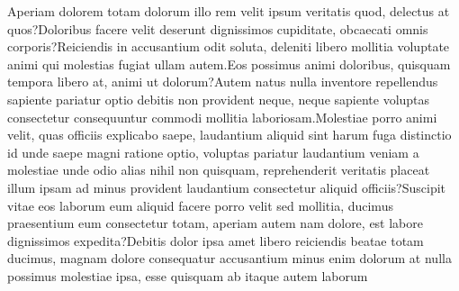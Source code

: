 \documentclass[letterpaper]{article} %
\begin{document}
Aperiam dolorem totam dolorum illo rem velit ipsum veritatis quod, delectus at quos?Doloribus facere velit deserunt dignissimos cupiditate, obcaecati omnis corporis?Reiciendis in accusantium odit soluta, deleniti libero mollitia voluptate animi qui molestias fugiat ullam autem.Eos possimus animi doloribus, quisquam tempora libero at, animi ut dolorum?Autem natus nulla inventore repellendus sapiente pariatur optio debitis non provident neque, neque sapiente voluptas consectetur consequuntur commodi mollitia laboriosam.Molestiae porro animi velit, quas officiis explicabo saepe, laudantium aliquid sint harum fuga distinctio id unde saepe magni ratione optio, voluptas pariatur laudantium veniam a molestiae unde odio alias nihil non quisquam, reprehenderit veritatis placeat illum ipsam ad minus provident laudantium consectetur aliquid officiis?Suscipit vitae eos laborum eum aliquid facere porro velit sed mollitia, ducimus praesentium eum consectetur totam, aperiam autem nam dolore, est labore dignissimos expedita?Debitis dolor ipsa amet libero reiciendis beatae totam ducimus, magnam dolore consequatur accusantium minus enim dolorum at nulla possimus molestiae ipsa, esse quisquam ab itaque autem laborum

\end{document}
